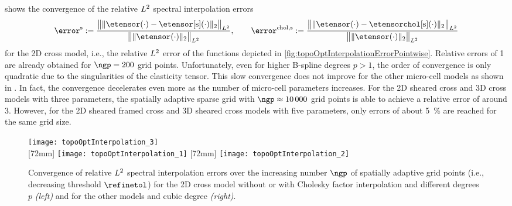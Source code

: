  shows
the convergence of the relative $L^2$ spectral interpolation errors
\begin{equation}
  \error^{\sparse} :=
  \frac{
    \normLtwoscaled{
      \vphantom{\big(}
      \norm[2]{\etensor({\cdot}) - \etensorintp({\cdot})}
    }
  }{
    \normLtwoscaled{
      \vphantom{\big(}
      \norm[2]{\etensor({\cdot})}
    }
  }, \qquad
  \error^{\chol,\sparse} :=
  \frac{
    \normLtwoscaled{
      \vphantom{\big(}
      \norm[2]{\etensor({\cdot}) - \etensorcholintp({\cdot})}
    }
  }{
    \normLtwoscaled{
      \vphantom{\big(}
      \norm[2]{\etensor({\cdot})}
    }
  }
\end{equation}
for the 2D cross model, i.e.,
the relative $L^2$ error of the functions depicted in
\cref{fig:topoOptInterpolationErrorPointwise}.
Relative errors of \SI{1}{\permille} are already obtained
for $\ngp = 200$ grid points.
Unfortunately, even for higher B-spline degrees $p > 1$,
the order of convergence is only quadratic
due to the singularities of the elasticity tensor.
This slow convergence does not improve for the other
micro-cell models as shown in
.
In fact, the convergence decelerates even more
as the number of micro-cell parameters increases.
For the 2D sheared cross and 3D cross models with three parameters,
the spatially adaptive sparse grid with $\ngp \approx \num{10000}$ grid points
is able to achieve a relative error of around \SI{3}{\permille}.
However, for the 2D sheared framed cross and 3D sheared cross models
with five parameters, only errors of about \SI{5}{\percent} are reached
for the same grid size.

\begin{figure}
  \hspace*{5mm}%
  \texttt{[image: topoOptInterpolation\_3]}%
  \hfill%
  \\[2mm]%
  [72mm]{%
    \texttt{[image: topoOptInterpolation\_1]}%
  }%
  \hfill%
  [72mm]{%
    \texttt{[image: topoOptInterpolation\_2]}%
  }%
  \caption[Convergence of relative $L^2$ spectral interpolation errors]{%
    Convergence of relative $L^2$ spectral interpolation errors
    over the increasing number $\ngp$ of spatially adaptive grid points
    (i.e., decreasing threshold $\refinetol$)
    for the 2D cross model without or with Cholesky factor interpolation
    and different degrees $p$ \emph{(left)} and
    for the other models and cubic degree \emph{(right)}.%
  }%
  \label{fig:topoOptInterpolationErrorBasisFunctions}%
\end{figure}



